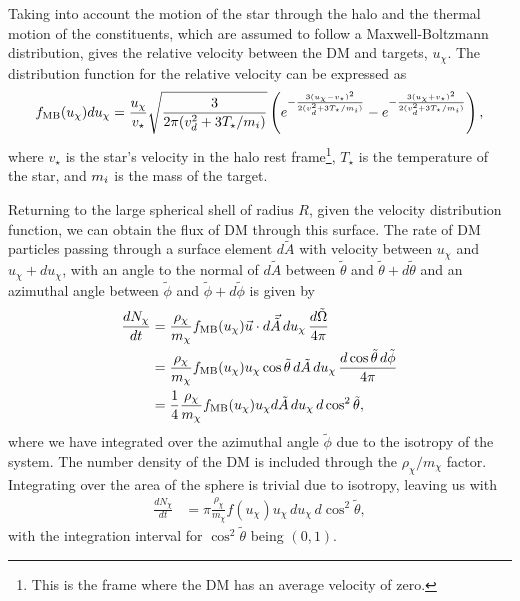 Taking into account the motion of the star through the halo and the thermal motion of the constituents, which are assumed to follow a Maxwell-Boltzmann distribution, gives the relative velocity between the DM and targets, $ u_\chi$. 
The distribution function for the relative velocity can be expressed as~\cite{Busoni:2017mhe_oct_Evaporationscatteringmomentum}
\begin{equation}
    f_{\mathrm{MB}}(u_\chi)du_\chi = \frac{u_\chi}{v_\star} \sqrt{\frac{3 }{2 \pi (v_d^2 + 3 T_\star /m_i)}} \left( e^{-\frac{3(u_\chi - v_\star)^2}{2(v_d^2 + 3 T_\star /m_i)}} - e^{-\frac{3(u_\chi + v_\star)^2}{2(v_d^2 + 3 T_\star /m_i)}} \right),
\end{equation}
where $v_\star$ is the star's velocity in the halo rest frame\footnote{This is the frame where the DM has an average velocity of zero.}, $T_\star$ is the temperature of the star, and $m_i$ is the mass of the target.

Returning to the large spherical shell of radius $R$, given the velocity distribution function, we can obtain the flux of DM through this surface. The rate of DM particles passing through a surface element $d\tilde{A}$ with velocity between $u_\chi$ and $u_\chi + du_\chi$, with an angle to the normal of $d\tilde{A}$ between $\tilde\theta$ and $\tilde \theta + d\tilde \theta$ and an azimuthal angle between $\tilde \phi$ and $\tilde \phi + d\tilde \phi$ is given by~\cite{Press:1985ug_Capturesungalactic}
\begin{align}
    \frac{dN_\chi}{dt} &= \frac{\rho_\chi}{m_\chi}f_{\mathrm{MB}}(u_\chi) \vec{u}\cdot d\vec{\tilde{A}}\, d u_\chi\, \frac{d\tilde \Omega}{4\pi}\\
    & = \frac{\rho_\chi}{m_\chi}f_{\rm MB}(u_\chi)u_\chi \cos\tilde\theta \,d\tilde{A}\, d u_\chi\,  \frac{d\cos\tilde\theta \,d\tilde\phi}{4\pi}\\
    & = \frac{1}{4}\frac{\rho_\chi}{m_\chi}f_{\rm MB}(u_\chi)u_\chi d\tilde{A}\, d u_\chi\,d\cos^2\tilde\theta,
\end{align}
where we have integrated over the azimuthal angle $\tilde \phi$ due to the isotropy of the system. The number density of the DM is included through the $\rho_\chi/m_\chi$ factor. 
Integrating over the area of the sphere is trivial due to isotropy, leaving us with 
\begin{align}
    \frac{dN_\chi}{dt} &= \pi \frac{\rho_\chi}{m_\chi} f(u_\chi)u_\chi\, d u_\chi \, d\cos^2\tilde\theta,
\end{align}
with the integration interval for $\cos^2\tilde\theta$ being $(0, 1)$.

